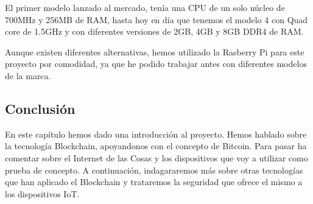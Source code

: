 \vspace{5mm}

\noindent El primer modelo lanzado al mercado, tenía una CPU de un solo núcleo de 700MHz y 256MB de RAM, hasta hoy en 
día que tenemos el modelo 4 con Quad core de 1.5GHz y con diferentes versiones de 2GB, 4GB y 8GB DDR4 de RAM.

\vspace{5mm}

\noindent Aunque existen diferentes alternativas, hemos utilizado la Rasberry Pi para este proyecto por comodidad, ya 
que he podido trabajar antes con diferentes modelos de la marca.

\subsection{Conclusión}

En este capítulo hemos dado una introducción al proyecto. Hemos hablado sobre la tecnología Blockchain, apoyandonos 
con el concepto de Bitcoin. Para pasar ha comentar sobre el Internet de las Cosas y los dispositivos que voy a utilizar 
como prueba de concepto. A continuación, indagararemos más sobre otras tecnologías que han aplicado el Blockchain y 
trataremos la seguridad que ofrece el mismo a los dispositivos IoT.

\newpage